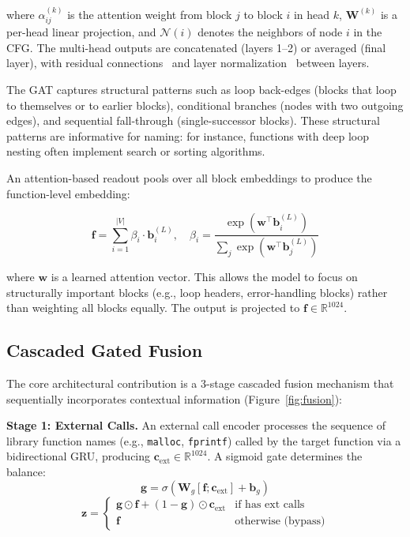 \documentclass[sigconf,nonacm]{acmart}
\begin{document}
where $\alpha_{ij}^{(k)}$ is the attention weight from block $j$ to block $i$ in head $k$, $\mathbf{W}^{(k)}$ is a per-head linear projection, and $\mathcal{N}(i)$ denotes the neighbors of node $i$ in the CFG. The multi-head outputs are concatenated (layers 1--2) or averaged (final layer), with residual connections~\cite{resnet} and layer normalization~\cite{layernorm} between layers.

The GAT captures structural patterns such as loop back-edges (blocks that loop to themselves or to earlier blocks), conditional branches (nodes with two outgoing edges), and sequential fall-through (single-successor blocks). These structural patterns are informative for naming: for instance, functions with deep loop nesting often implement search or sorting algorithms.

An attention-based readout pools over all block embeddings to produce the function-level embedding:

\begin{equation}
    \mathbf{f} = \sum_{i=1}^{|V|} \beta_i \cdot \mathbf{b}_i^{(L)}, \quad \beta_i = \frac{\exp(\mathbf{w}^\top \mathbf{b}_i^{(L)})}{\sum_{j} \exp(\mathbf{w}^\top \mathbf{b}_j^{(L)})}
\end{equation}

where $\mathbf{w}$ is a learned attention vector. This allows the model to focus on structurally important blocks (e.g., loop headers, error-handling blocks) rather than weighting all blocks equally. The output is projected to $\mathbf{f} \in \mathbb{R}^{1024}$.

\subsection{Cascaded Gated Fusion}
\label{sec:fusion}

The core architectural contribution is a 3-stage cascaded fusion mechanism that sequentially incorporates contextual information (Figure~\ref{fig:fusion}):

\textbf{Stage 1: External Calls.} An external call encoder processes the sequence of library function names (e.g., \texttt{malloc}, \texttt{fprintf}) called by the target function via a bidirectional GRU, producing $\mathbf{c}_\text{ext} \in \mathbb{R}^{1024}$. A sigmoid gate determines the balance:
\begin{equation}
    \mathbf{g} = \sigma(\mathbf{W}_g [\mathbf{f}; \mathbf{c}_\text{ext}] + \mathbf{b}_g)
\end{equation}
\begin{equation}
    \mathbf{z} = \begin{cases}
        \mathbf{g} \odot \mathbf{f} + (1 - \mathbf{g}) \odot \mathbf{c}_\text{ext} & \text{if has ext calls} \\
        \mathbf{f} & \text{otherwise (bypass)}
    \end{cases}
\end{equation}
\end{document}
